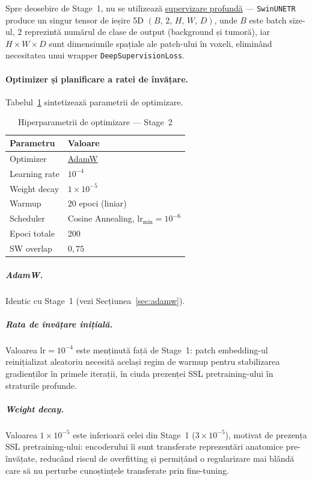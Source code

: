 \documentclass[12pt, a4paper]{report}
\begin{document}
Spre deosebire de Stage~1, nu se utilizează
\hyperref[sec:deepsupervision]{supervizare profundă} —
\texttt{SwinUNETR} produce un singur tensor de ieșire 5D
$(B,\, 2,\, H,\, W,\, D)$, unde $B$ este batch size-ul,
$2$ reprezintă numărul de clase de output (background și tumoră),
iar $H \times W \times D$ sunt dimensiunile spațiale ale patch-ului
în voxeli, eliminând necesitatea unui wrapper
\texttt{DeepSupervisionLoss}.



\paragraph{Optimizer și planificare a ratei de învățare.}
Tabelul~\ref{tab:stage2_optim} sintetizează parametrii de optimizare.

\begin{table}[H]
  \centering
  \caption{Hiperparametrii de optimizare — Stage~2}
  \label{tab:stage2_optim}
  \begin{tabular}{ll}
    \hline
    \textbf{Parametru} & \textbf{Valoare} \\
    \hline
    Optimizer          & \hyperref[sec:adamw]{AdamW} \\
    Learning rate      & $10^{-4}$ \\
    Weight decay       & $1 \times 10^{-5}$ \\
    Warmup             & 20 epoci (liniar) \\
    Scheduler          & Cosine Annealing, $\text{lr}_{\min} = 10^{-6}$ \\
    Epoci totale       & 200 \\
    SW overlap         & $0{,}75$ \\
    \hline
  \end{tabular}
\end{table}

\subparagraph{AdamW.}
Identic cu Stage~1
(vezi Secțiunea~\ref{sec:adamw}).

\subparagraph{Rata de învățare inițială.}
Valoarea $\text{lr} = 10^{-4}$ este menținută față de Stage~1:
patch embedding-ul reinițializat aleatoriu necesită același regim
de warmup pentru stabilizarea gradienților în primele iterații,
în ciuda prezenței SSL pretraining-ului în straturile profunde.

\subparagraph{Weight decay.}
Valoarea $1 \times 10^{-5}$ este inferioară celei din Stage~1
($3 \times 10^{-5}$), motivat de prezența SSL pretraining-ului:
encoderului îi sunt transferate reprezentări anatomice pre-învățate,
reducând riscul de overfitting și permițând o regularizare mai
blândă care să nu perturbe cunoștințele transferate prin fine-tuning.
\end{document}
